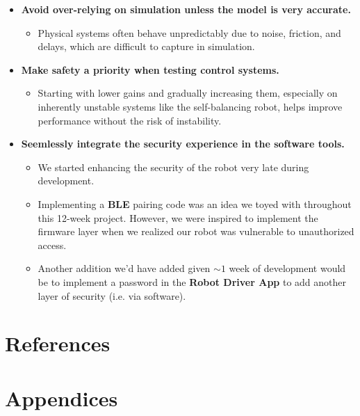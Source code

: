 \documentclass{article}
\begin{document}
\begin{minipage}{\linewidth}
\begin{itemize}
            \item \textbf{Avoid over-relying on simulation unless the model is very accurate.}
                \begin{itemize}
                    \item Physical systems often behave unpredictably due to noise, friction, and delays, which are difficult to capture in simulation.
                \end{itemize}

            \item \textbf{Make safety a priority when testing control systems.}
                \begin{itemize}
                    \item Starting with lower gains and gradually increasing them, especially on inherently unstable systems like the self-balancing robot, helps improve performance without the risk of instability.
                \end{itemize}

            \item \textbf{Seemlessly integrate the security experience in the software tools.}
                \begin{itemize}
                    \item We started enhancing the security of the robot very late during development.
                    \item Implementing a \textbf{BLE} pairing code was an idea we toyed with throughout this 12-week project. However, we were inspired to implement the firmware layer when we realized our robot was vulnerable to unauthorized access.
                    \item Another addition we'd have added given $\sim 1$ week of development would be to implement a password in the \textbf{Robot Driver App} to add another layer of security (i.e. via software).
                \end{itemize}
        \end{itemize}
    \end{minipage}

\section{References}
\printbibliography[heading=none]

\section{Appendices}
\end{document}
